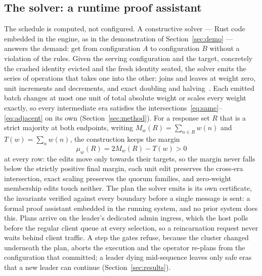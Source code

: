 \documentclass[10pt,journal,letterpaper]{IEEEtran}
\begin{document}
\subsection{The solver: a runtime proof assistant}
The schedule is computed, not configured. A constructive solver --- Rust code embedded in the engine, as in the demonstration of Section~\ref{sec:demo} --- answers the demand: get from configuration $A$ to configuration $B$ without a violation of the rules. Given the serving configuration and the target, concretely the crashed identity evicted and the fresh identity seated, the solver emits the series of operations that takes one into the other: joins and leaves at weight zero, unit increments and decrements, and exact doubling and halving~\cite{votingweights}. Each emitted batch changes at most one unit of total absolute weight or scales every weight exactly, so every intermediate era satisfies the intersections~\eqref{eq:same}--\eqref{eq:adjacent} on its own (Section~\ref{sec:method}). For a response set $R$ that is a strict majority at both endpoints, writing $M_w(R) = \sum_{n \in R} w(n)$ and $T(w) = \sum_n w(n)$, the construction keeps the margin
\begin{equation*}
\mu_w(R) = 2 M_w(R) - T(w) > 0
\end{equation*}
at every row: the edits move only towards their targets, so the margin never falls below the strictly positive final margin, each unit edit preserves the cross-era intersection, exact scaling preserves the quorum families, and zero-weight membership edits touch neither. The plan the solver emits is its own certificate, the invariants verified against every boundary before a single message is sent: a formal proof assistant embedded in the running system, and no prior system does this. Plans arrive on the leader's dedicated admin ingress, which the host polls before the regular client queue at every selection, so a reincarnation request never waits behind client traffic. A step the gates refuse, because the cluster changed underneath the plan, aborts the execution and the operator re-plans from the configuration that committed; a leader dying mid-sequence leaves only safe eras that a new leader can continue (Section~\ref{sec:results}).
\end{document}
